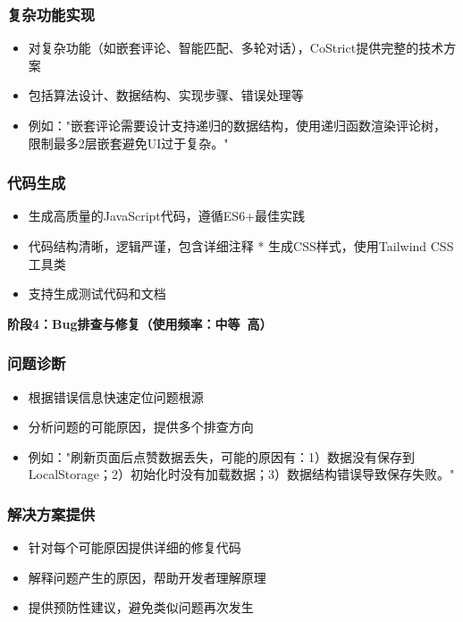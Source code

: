 ﻿\documentclass[12pt,a4paper]{article}
\begin{document}
\subsubsection{复杂功能实现}
\begin{itemize}
    \item 对复杂功能（如嵌套评论、智能匹配、多轮对话），CoStrict提供完整的技术方案
    \item 包括算法设计、数据结构、实现步骤、错误处理等
    \item 例如："嵌套评论需要设计支持递归的数据结构，使用递归函数渲染评论树，限制最多2层嵌套避免UI过于复杂。"
\end{itemize}

\subsubsection{代码生成}
\begin{itemize}
    \item 生成高质量的JavaScript代码，遵循ES6+最佳实践
    \item 代码结构清晰，逻辑严谨，包含详细注释
    * 生成CSS样式，使用Tailwind CSS工具类
    \item 支持生成测试代码和文档
\end{itemize}

\textbf{阶段4：Bug排查与修复（使用频率：中等~高）}

\subsubsection{问题诊断}
\begin{itemize}
    \item 根据错误信息快速定位问题根源
    \item 分析问题的可能原因，提供多个排查方向
    \item 例如："刷新页面后点赞数据丢失，可能的原因有：1）数据没有保存到LocalStorage；2）初始化时没有加载数据；3）数据结构错误导致保存失败。"
\end{itemize}

\subsubsection{解决方案提供}
\begin{itemize}
    \item 针对每个可能原因提供详细的修复代码
    \item 解释问题产生的原因，帮助开发者理解原理
    \item 提供预防性建议，避免类似问题再次发生
\end{itemize}
\end{document}
